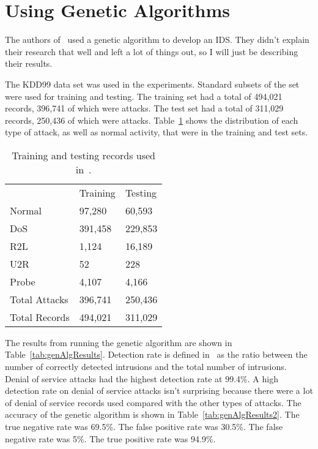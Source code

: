 \documentclass{sig-alternate}
\begin{document}
\section{Using Genetic Algorithms}
\label{sec:genAlgImp}

The authors of~\cite{DBLP:journals/corr/abs-1204-1336} used a genetic algorithm to develop an IDS. They didn't explain their research that well and left a lot of things out, so I will just be describing their results.

The KDD99 data set was used in the experiments. Standard subsets of the set were used for training and testing. The training set had a total of 494,021 records, 396,741 of which were attacks. The test set had a total of 311,029 records, 250,436 of which were attacks. Table~\ref{tab:numberOfRecords} shows the distribution of each type of attack, as well as normal activity, that were in the training and test sets.

\begin{table}
\center
\caption{Training and testing records used in~\cite{DBLP:journals/corr/abs-1204-1336}.}
\vspace{0.20cm}
\begin{tabular}{lll}
  & Training & Testing \\ 
Normal & 97,280 & 60,593\\ \hline
DoS	   & 391,458 & 229,853\\
R2L    & 1,124   & 16,189\\
U2R    & 52      & 228\\
Probe  & 4,107  & 4,166\\ \hline
Total Attacks & 396,741 & 250,436 \\
Total Records  & 494,021 & 311,029\\
\end{tabular}
\center
\label{tab:numberOfRecords}
\end{table}



The results from running the genetic algorithm are shown in Table~\ref{tab:genAlgResults}. Detection rate is defined in~\cite{DBLP:journals/corr/abs-1204-1336} as the ratio between the number of correctly detected intrusions and the total number of intrusions. Denial of service attacks had the highest detection rate at 99.4\%. A high detection rate on denial of service attacks isn't surprising because there were a lot of denial of service records used compared with the other types of attacks. The accuracy of the genetic algorithm is shown in Table~\ref{tab:genAlgResults2}. The true negative rate was 69.5\%. The false positive rate was 30.5\%. The false negative rate was 5\%. The true positive rate was 94.9\%.
\end{document}
